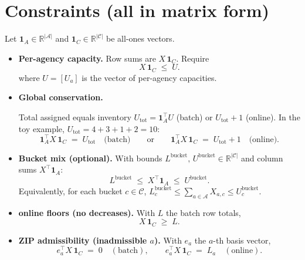 \documentclass[11pt]{article}
\newcommand{\A}{\mathcal{A}}                 %
\newcommand{\C}{\mathcal{C}}                 %
\newcommand{\R}{\mathbb{R}}
\begin{document}
\section{Constraints (all in matrix form)}

Let $\mathbf{1}_A\in\R^{|\A|}$ and $\mathbf{1}_C\in\R^{|\C|}$ be all-ones vectors.

\begin{itemize}[leftmargin=*]

\item \textbf{Per-agency capacity.} Row sums are $X\,\mathbf{1}_C$. Require
\begin{equation*}
X\,\mathbf{1}_C \;\le\; U.
\end{equation*}
where $U = [U_a]$ is the vector of per-agency capacities.

\item \textbf{Global conservation.} 

Total assigned equals inventory 
$U_{\mathrm{tot}}=\mathbf{1}_A^\top U$ (batch) or $U_{\mathrm{tot}}+1$ (online).
In the toy example, $U_{\mathrm{tot}}=4+3+1+2=10$:
\begin{equation*}
\mathbf{1}_A^\top X\,\mathbf{1}_C \;=\; U_{\mathrm{tot}}
\quad\text{(batch)}
\qquad\text{or}\qquad
\mathbf{1}_A^\top X\,\mathbf{1}_C \;=\; U_{\mathrm{tot}} + 1
\quad\text{(online)}.
\end{equation*}

\item \textbf{Bucket mix (optional).} With bounds 
$L^{\text{bucket}},\,U^{\text{bucket}} \in \mathbb{R}^{|\C|}$ and column sums $X^\top \mathbf{1}_A$:
\begin{equation*}
L^{\text{bucket}} \;\le\; X^\top \mathbf{1}_A \;\le\; U^{\text{bucket}}.
\end{equation*}
Equivalently, for each bucket $c \in \C$,
$L^{\text{bucket}}_c \le \sum_{a\in\A} X_{a,c} \le U^{\text{bucket}}_c$.

\item \textbf{online floors (no decreases).} With $L$ the batch row totals,
\begin{equation*}
X\,\mathbf{1}_C \;\ge\; L.
\end{equation*}

\item \textbf{ZIP admissibility (inadmissible $a$).} With $e_a$ the $a$-th basis vector,
\begin{equation*}
e_a^\top X\,\mathbf{1}_C \;=\; 0 \quad (\text{batch}),\qquad
e_a^\top X\,\mathbf{1}_C \;=\; L_a \quad (\text{online}).
\end{equation*}


\end{itemize}
\end{document}
